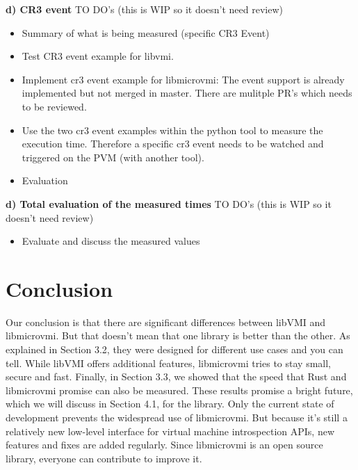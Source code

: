 \documentclass[sigconf]{acmart}
\begin{document}
\textbf{d) CR3 event}
\newline
\newline
TO DO's (this is WIP so it doesn't need review)
\begin{itemize}
	\item Summary of what is being measured (specific CR3 Event)
	\newline 
	\item Test CR3 event example for libvmi. 
	\newline
	\item Implement cr3 event example for libmicrovmi: The event support is already implemented but not merged in master. There are mulitple PR's which needs to be reviewed.
	\newline
	\item Use the two cr3 event examples within the python tool to measure the execution time. Therefore a specific cr3 event needs to be watched and triggered on the PVM (with another tool).
	\newline
	\item Evaluation
	\newline
	\newline
\end{itemize}

\textbf{d) Total evaluation of the measured times}
\newline
\newline
TO DO's (this is WIP so it doesn't need review)
\begin{itemize}
	\item Evaluate and discuss the measured values
	\newline
\end{itemize}

\section{Conclusion}
Our conclusion is that there are significant differences between libVMI and libmicrovmi. But that doesn’t mean that one library is better than the other. As explained in Section 3.2, they were designed for different use cases and you can tell. While libVMI offers additional features, libmicrovmi tries to stay small, secure and fast. Finally, in Section 3.3, we showed that the speed that Rust and libmicrovmi promise can also be measured. These results promise a bright future, which we will discuss in Section 4.1, for the library.
\newline
\newline
Only the current state of development prevents the widespread use of libmicrovmi. But because it’s still a relatively new low-level interface for virtual machine introspection APIs, new features and fixes are added regularly. Since libmicrovmi is an open source library, everyone can contribute to improve it.
\end{document}
